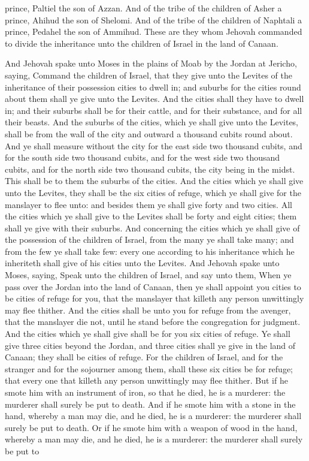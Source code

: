 prince, Paltiel the son of Azzan. And of the tribe of the children of Asher a prince, Ahihud the son of Shelomi. And of the tribe of the children of Naphtali a prince, Pedahel the son of Ammihud. These are they whom Jehovah commanded to divide the inheritance unto the children of Israel in the land of Canaan. 

And Jehovah spake unto Moses in the plains of Moab by the Jordan at Jericho, saying, Command the children of Israel, that they give unto the Levites of the inheritance of their possession cities to dwell in; and suburbs for the cities round about them shall ye give unto the Levites. And the cities shall they have to dwell in; and their suburbs shall be for their cattle, and for their substance, and for all their beasts. And the suburbs of the cities, which ye shall give unto the Levites, shall be from the wall of the city and outward a thousand cubits round about. And ye shall measure without the city for the east side two thousand cubits, and for the south side two thousand cubits, and for the west side two thousand cubits, and for the north side two thousand cubits, the city being in the midst. This shall be to them the suburbs of the cities. And the cities which ye shall give unto the Levites, they shall be the six cities of refuge, which ye shall give for the manslayer to flee unto: and besides them ye shall give forty and two cities. All the cities which ye shall give to the Levites shall be forty and eight cities; them shall ye give with their suburbs. And concerning the cities which ye shall give of the possession of the children of Israel, from the many ye shall take many; and from the few ye shall take few: every one according to his inheritance which he inheriteth shall give of his cities unto the Levites.  And Jehovah spake unto Moses, saying, Speak unto the children of Israel, and say unto them, When ye pass over the Jordan into the land of Canaan, then ye shall appoint you cities to be cities of refuge for you, that the manslayer that killeth any person unwittingly may flee thither. And the cities shall be unto you for refuge from the avenger, that the manslayer die not, until he stand before the congregation for judgment. And the cities which ye shall give shall be for you six cities of refuge. Ye shall give three cities beyond the Jordan, and three cities shall ye give in the land of Canaan; they shall be cities of refuge. For the children of Israel, and for the stranger and for the sojourner among them, shall these six cities be for refuge; that every one that killeth any person unwittingly may flee thither.  But if he smote him with an instrument of iron, so that he died, he is a murderer: the murderer shall surely be put to death. And if he smote him with a stone in the hand, whereby a man may die, and he died, he is a murderer: the murderer shall surely be put to death. Or if he smote him with a weapon of wood in the hand, whereby a man may die, and he died, he is a murderer: the murderer shall surely be put to 